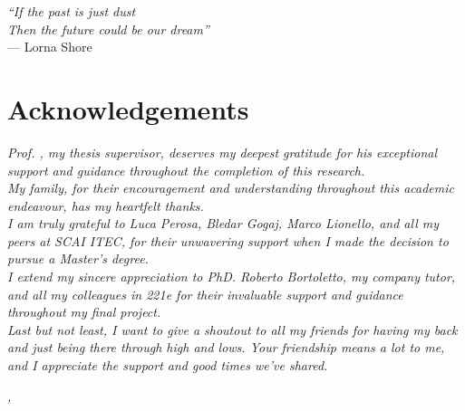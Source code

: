\cleardoublepage
{}
{}

\begin{flushright}{
    \slshape
    ``If the past is just dust\\ Then the future could be our dream''} \\
    \medskip
    --- Lorna Shore 
\end{flushright}


\bigskip

\begingroup
\let\clearpage\relax
\let\cleardoublepage\relax
\let\cleardoublepage\relax

\chapter*{Acknowledgements}

\noindent \textit{Prof. \myProf, my thesis supervisor, deserves my deepest gratitude for his exceptional support and guidance throughout the completion of this research.}\\
\noindent \textit{My family, for their encouragement and understanding throughout this academic endeavour, has my heartfelt thanks.}\\
\noindent \textit{I am truly grateful to Luca Perosa, Bledar Gogaj, Marco Lionello, and all my peers at SCAI ITEC, for their unwavering support when I made the decision to pursue a Master’s degree.}\\
\noindent \textit{I extend my sincere appreciation to PhD. Roberto Bortoletto, my company tutor, and all my colleagues in 221e for their invaluable support and guidance throughout my final project.}\\
\noindent \textit{Last but not least, I want to give a shoutout to all my friends for having my back and just being there through high and lows. Your friendship means a lot to me, and I appreciate the support and good times we've shared.}\\
\bigskip

\noindent\textit{\myLocation, \myTime}
\hfill \myName

\endgroup
